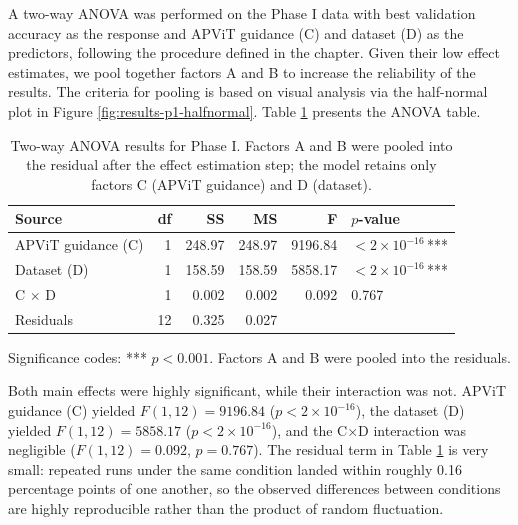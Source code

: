 A two-way ANOVA was performed on the Phase I data with best validation accuracy as the response and APViT guidance (C) and dataset (D) as the predictors, following the procedure defined in the  chapter. Given their low effect estimates, we pool together factors A and B to increase the reliability of the results. The criteria for pooling is based on visual analysis via the half-normal plot in Figure \ref{fig:results-p1-halfnormal}. Table \ref{tab:results-anova} presents the ANOVA table.\\

\begin{table}[h!]
    \centering
    \begin{tabular}{@{}lrrrrl@{}}
    \toprule
    \textbf{Source} & \textbf{df} & \textbf{SS} & \textbf{MS} & \textbf{F} & \textbf{$p$-value} \\
    \midrule
    APViT guidance (C)  & 1  & 248.97 & 248.97 & 9196.84 & $< 2\times10^{-16}$\,*** \\
    Dataset (D)         & 1  & 158.59 & 158.59 & 5858.17 & $< 2\times10^{-16}$\,*** \\
    C $\times$ D        & 1  &   0.002 &   0.002 &   0.092 & 0.767\phantom{$\times10^{-16}$\,***} \\
    Residuals           & 12 &   0.325 &   0.027 & & \\
    \bottomrule
    \end{tabular}
    \smallskip

    \footnotesize{Significance codes: *** $p < 0.001$. Factors A and B were pooled into the residuals.}
    \caption[Phase I two-way ANOVA]{Two-way ANOVA results for Phase I. Factors A and B were pooled into the residual after the effect estimation step; the model retains only factors C (APViT guidance) and D (dataset).}
    \label{tab:results-anova}
\end{table}

Both main effects were highly significant, while their interaction was not. APViT guidance (C) yielded $F(1, 12) = 9196.84$ ($p < 2 \times 10^{-16}$), the dataset (D) yielded $F(1, 12) = 5858.17$ ($p < 2 \times 10^{-16}$), and the C×D interaction was negligible ($F(1, 12) = 0.092$, $p = 0.767$). The residual term in Table \ref{tab:results-anova} is very small: repeated runs under the same condition landed within roughly 0.16 percentage points of one another, so the observed differences between conditions are highly reproducible rather than the product of random fluctuation.\\

